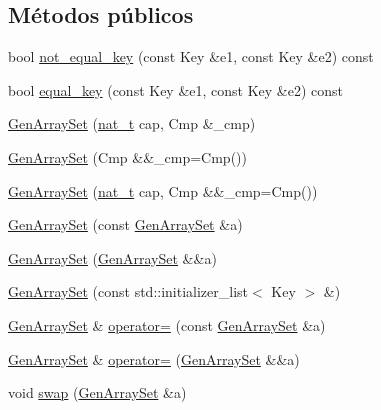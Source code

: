 \subsection*{Métodos públicos}
\begin{DoxyCompactItemize}
\item 
bool \hyperlink{class_designar_1_1_gen_array_set_a048871f9ab15af3c26cfda4dbb47d272}{not\+\_\+equal\+\_\+key} (const Key \&e1, const Key \&e2) const
\item 
bool \hyperlink{class_designar_1_1_gen_array_set_a2874b036273f5cc48275bd1242453930}{equal\+\_\+key} (const Key \&e1, const Key \&e2) const
\item 
\hyperlink{class_designar_1_1_gen_array_set_a51b519b8c338a8f0e4db3d50e77bfd6f}{Gen\+Array\+Set} (\hyperlink{namespace_designar_aa72662848b9f4815e7bf31a7cf3e33d1}{nat\+\_\+t} cap, Cmp \&\+\_\+cmp)
\item 
\hyperlink{class_designar_1_1_gen_array_set_a6dd76e1d1ccb49b3e984c18b05c98dd2}{Gen\+Array\+Set} (Cmp \&\&\+\_\+cmp=Cmp())
\item 
\hyperlink{class_designar_1_1_gen_array_set_ab2ffd26edcd909f936394e538b43d2c4}{Gen\+Array\+Set} (\hyperlink{namespace_designar_aa72662848b9f4815e7bf31a7cf3e33d1}{nat\+\_\+t} cap, Cmp \&\&\+\_\+cmp=Cmp())
\item 
\hyperlink{class_designar_1_1_gen_array_set_a2cdf04753abc21b6f10a795fdac2238c}{Gen\+Array\+Set} (const \hyperlink{class_designar_1_1_gen_array_set}{Gen\+Array\+Set} \&a)
\item 
\hyperlink{class_designar_1_1_gen_array_set_af0b02756ac00f4b364422908a0e94e73}{Gen\+Array\+Set} (\hyperlink{class_designar_1_1_gen_array_set}{Gen\+Array\+Set} \&\&a)
\item 
\hyperlink{class_designar_1_1_gen_array_set_a53cc511f4539c16b1542f56979433c2a}{Gen\+Array\+Set} (const std\+::initializer\+\_\+list$<$ Key $>$ \&)
\item 
\hyperlink{class_designar_1_1_gen_array_set}{Gen\+Array\+Set} \& \hyperlink{class_designar_1_1_gen_array_set_ab30a4cf17a20eb6005cfed15762c1568}{operator=} (const \hyperlink{class_designar_1_1_gen_array_set}{Gen\+Array\+Set} \&a)
\item 
\hyperlink{class_designar_1_1_gen_array_set}{Gen\+Array\+Set} \& \hyperlink{class_designar_1_1_gen_array_set_afb89b3abb4a394341430ca8ae29a9ca2}{operator=} (\hyperlink{class_designar_1_1_gen_array_set}{Gen\+Array\+Set} \&\&a)
\item 
void \hyperlink{class_designar_1_1_gen_array_set_ab117cdee923c27d7922a02336440b2ff}{swap} (\hyperlink{class_designar_1_1_gen_array_set}{Gen\+Array\+Set} \&a)

\end{DoxyCompactItemize}
